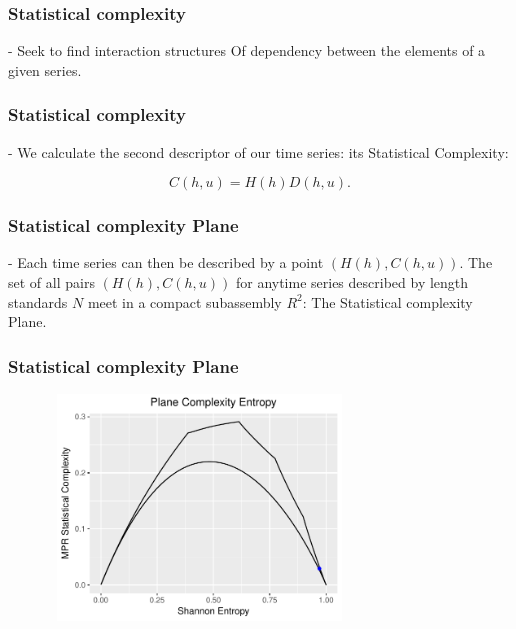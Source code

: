\documentclass[10pt, compress]{beamer}
\begin{document}
 
\begin{frame}[fragile]
\frametitle{Statistical complexity}

- Seek to find interaction structures
Of dependency between the elements of a given series.

\end{frame}
 
\begin{frame}[fragile]
\frametitle{Statistical complexity}

- We calculate the second descriptor of our time series: its Statistical Complexity:

\begin{equation}
C( h, u) = H( h) D( h,  u).
\end{equation}

\end{frame}

\begin{frame}[fragile]
\frametitle{Statistical complexity Plane}

- Each time series can then be described by a point $(H( h), C( h,  u))$.
The set of all pairs $(H( h), C( h,  u))$ for anytime series described by length standards $N$ meet in a compact subassembly $ R^2$: The Statistical complexity Plane.

\end{frame}

\begin{frame}[fragile]
\frametitle{Statistical complexity Plane}

\begin{figure}
  \centering
   \includegraphics[width=8cm,height=6cm]{Rplot3.pdf}
\end{figure}
\end{frame}
\end{document}
